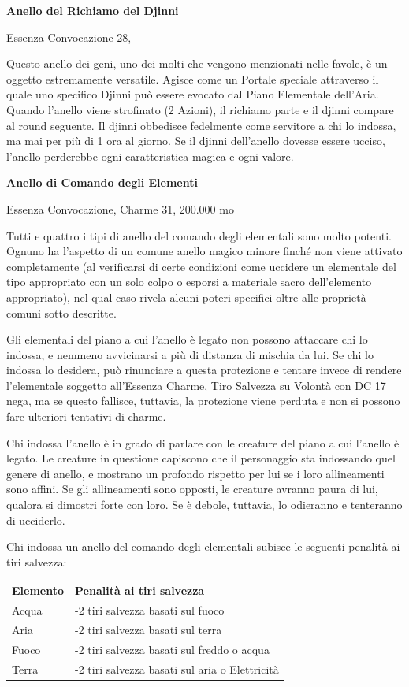 \documentclass[a4paper,11pt,twoside,openany]{book}
\begin{document}
\textbf{Anello del Richiamo del Djinni}

Essenza Convocazione 28,

Questo anello dei geni, uno dei molti che vengono menzionati nelle favole, è un oggetto estremamente versatile. Agisce come un Portale speciale attraverso il quale uno specifico Djinni può essere evocato dal Piano Elementale dell'Aria. Quando l'anello viene strofinato (2 Azioni), il richiamo parte e il djinni compare al round seguente. Il djinni obbedisce fedelmente come servitore a chi lo indossa, ma mai per più di 1 ora al giorno. Se il djinni dell'anello dovesse essere ucciso, l'anello perderebbe ogni caratteristica magica e ogni valore.

\textbf{Anello di Comando degli Elementi}

Essenza Convocazione, Charme 31, 200.000 mo

Tutti e quattro i tipi di anello del comando degli elementali sono molto potenti. Ognuno ha l'aspetto di un comune anello magico minore finché non viene attivato completamente (al verificarsi di certe condizioni come uccidere un elementale del tipo appropriato con un solo colpo o esporsi a materiale sacro dell'elemento appropriato), nel qual caso rivela alcuni poteri specifici oltre alle proprietà comuni sotto descritte.

Gli elementali del piano a cui l'anello è legato non possono attaccare chi lo indossa, e nemmeno avvicinarsi a più di distanza di mischia da lui. Se chi lo indossa lo desidera, può rinunciare a questa protezione e tentare invece di rendere l'elementale soggetto all'Essenza Charme, Tiro Salvezza su Volontà con DC 17 nega, ma se questo fallisce, tuttavia, la protezione viene perduta e non si possono fare ulteriori tentativi di charme.

Chi indossa l'anello è in grado di parlare con le creature del piano a cui l'anello è legato. Le creature in questione capiscono che il personaggio sta indossando quel genere di anello, e mostrano un profondo rispetto per lui se i loro allineamenti sono affini. Se gli allineamenti sono opposti, le creature avranno paura di lui, qualora si dimostri forte con loro. Se è debole, tuttavia, lo odieranno e tenteranno di ucciderlo.

Chi indossa un anello del comando degli elementali subisce le seguenti
penalità ai tiri salvezza:

\begin{tabular}{ll}
	\toprule
	\textbf{Elemento} & \textbf{Penalità ai tiri salvezza}\tabularnewline
	Acqua             & -2 tiri salvezza basati sul fuoco\tabularnewline
	Aria              & -2 tiri salvezza basati sul terra\tabularnewline
	Fuoco             & -2 tiri salvezza basati sul freddo o acqua\tabularnewline
	Terra             & -2 tiri salvezza basati sul aria o Elettricità\tabularnewline
\end{tabular}
\end{document}
